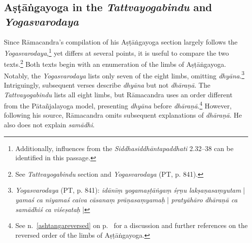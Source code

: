 \subsection{Aṣṭāṅgayoga in the \textit{Tattvayogabindu} and \textit{Yogasvarodaya}}
\label{ashtangayogax}
Since Rāmacandra's compilation of his Aṣṭāṅgayoga section largely follows the \textit{Yogasvarodaya},\footnote{Additionally, influences from the \emph{Siddhasiddhāntapaddhati} 2.32–38 can be identified in this passage.} yet differs at several points, it is useful to compare the two texts.\footnote{See \emph{Tattvayogabindu} section  and \textit{Yogasvarodaya} (PT, p. 841).}
Both texts begin with an enumeration of the limbs of Aṣṭāṅgayoga. Notably, the \emph{Yogasvarodaya} lists only seven of the eight limbs, omitting \textit{dhyāna}.\footnote{\textit{Yogasvarodaya} (PT, p. 841): \textit{idānīṃ yogamaṣṭāṅgaṃ śṛṇu lakṣaṇasaṃyutam} | \textit{yamaś ca niyamaś caiva cāsanaṃ prāṇasaṃyamaḥ} | \textit{pratyāhāro dhāraṇā ca samādhiś ca viśeṣataḥ} |} Intriguingly, subsequent verses describe \textit{dhyāna} but not \textit{dhāraṇā}. The \textit{Tattvayogabindu} lists all eight limbs, but Rāmacandra uses an order different from the Pātañjalayoga model, presenting \textit{dhyāna} before \textit{dhāraṇā}.\footnote{See n.~\ref{ashtangareversed} on p.~\pageref{ashtangareversed} for a discussion and further references on the reversed order of the limbs of Aṣṭāṅgayoga.} However, following his source, Rāmacandra omits subsequent explanations of \textit{dhāraṇā}. He also does not explain \emph{samādhi}.
